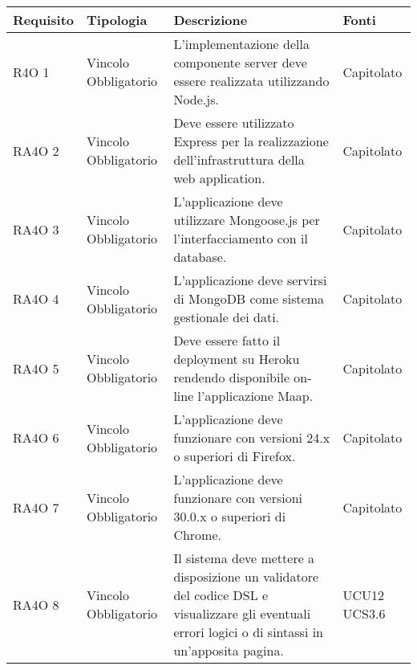       \begin{center}
      \bgroup
      \def\arraystretch{1.8}
      \begin{longtable}{ | l | p{2cm} | p{5cm} | p{1.7cm} |}
    
      \cellcolor[gray]{0.9} \textbf{Requisito} & \cellcolor[gray]{0.9} \textbf{Tipologia} 
      & \cellcolor[gray]{0.9} \textbf{Descrizione} & \cellcolor[gray]{0.9} \textbf{Fonti} \\ \hline
      
        R4O 1 & Vincolo \newline  Obbligatorio  & L’implementazione della componente server deve essere realizzata utilizzando Node.js. &  Capitolato \newline  \\ \hline      
        RA4O 2 & Vincolo \newline  Obbligatorio  & Deve essere utilizzato Express per la realizzazione dell’infrastruttura della web application. &  Capitolato \newline  \\ \hline      
        RA4O 3 & Vincolo \newline  Obbligatorio  & L’applicazione deve utilizzare Mongoose.js per l’interfacciamento con il database. &  Capitolato \newline  \\ \hline      
        RA4O 4 & Vincolo \newline  Obbligatorio  & L’applicazione deve servirsi di  MongoDB come sistema gestionale dei dati. &  Capitolato \newline  \\ \hline      
        RA4O 5 & Vincolo \newline  Obbligatorio  & Deve essere fatto il deployment su Heroku rendendo disponibile on-line l’applicazione Maap. &  Capitolato \newline  \\ \hline      
        RA4O 6 & Vincolo \newline  Obbligatorio  & L’applicazione deve funzionare con versioni 24.x o superiori di Firefox. &  Capitolato \newline  \\ \hline      
        RA4O 7 & Vincolo \newline  Obbligatorio  & L’applicazione deve funzionare con versioni 30.0.x o superiori di Chrome. &  Capitolato \newline  \\ \hline      
        RA4O 8 & Vincolo \newline  Obbligatorio  & Il sistema deve mettere a disposizione un validatore del codice DSL e visualizzare gli eventuali errori logici o di sintassi in un'apposita pagina. &  UCU12 \newline  UCS3.6 \newline  \\ \hline
      \end{longtable}
      \egroup
      \end{center}  
\clearpage

